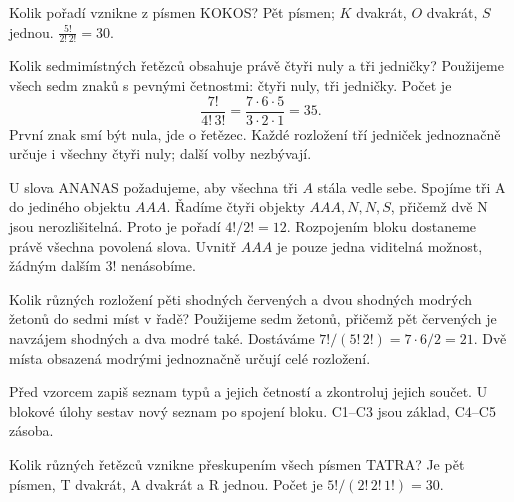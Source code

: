 \documentclass[11pt,a4paper]{article}
\begin{document}
\begin{prikladReseniBox}[title={Příklad P2}]
Kolik pořadí vznikne z písmen \textsc{KOKOS}?
\tcblower
Pět písmen; \(K\) dvakrát, \(O\) dvakrát, \(S\) jednou. \(\frac{5!}{2!\,2!}=30\).
\end{prikladReseniBox}


\begin{prikladReseniBox}[title={Příklad P3}]
Kolik sedmimístných řetězců obsahuje právě čtyři nuly a tři jedničky?
\tcblower
Použijeme všech sedm znaků s pevnými četnostmi: čtyři nuly, tři jedničky. Počet je
\[
 \frac{7!}{4!\,3!}=\frac{7\cdot6\cdot5}{3\cdot2\cdot1}=35.
\]
První znak smí být nula, jde o řetězec. Každé rozložení tří jedniček jednoznačně určuje i všechny čtyři nuly; další volby nezbývají.
\end{prikladReseniBox}


\begin{prikladReseniBox}[title={Příklad P4}]
U slova \textsc{ANANAS} požadujeme, aby všechna tři \(A\) stála vedle sebe.
\tcblower
Spojíme tři A do jediného objektu $AAA$. Řadíme čtyři objekty $AAA,N,N,S$, přičemž dvě N jsou nerozlišitelná. Proto je pořadí $4!/2!=12$. Rozpojením bloku dostaneme právě všechna povolená slova. Uvnitř $AAA$ je pouze jedna viditelná možnost, žádným dalším $3!$ nenásobíme.
\end{prikladReseniBox}


\begin{prikladReseniBox}[title={Příklad P5}]
Kolik různých rozložení pěti shodných červených a dvou shodných modrých žetonů do sedmi míst v řadě?
\tcblower
Použijeme sedm žetonů, přičemž pět červených je navzájem shodných a dva modré také. Dostáváme $7!/(5!\,2!)=7\cdot6/2=21$. Dvě místa obsazená modrými jednoznačně určují celé rozložení.
\end{prikladReseniBox}


\newpage
{}

Před vzorcem zapiš seznam typů a jejich četností a zkontroluj jejich součet. U blokové úlohy sestav nový seznam po spojení bloku. C1–C3 jsou základ, C4–C5 zásoba.

\begin{zadaniReseniBox}[title={Úloha C1}]
Kolik různých řetězců vznikne přeskupením všech písmen \textsc{TATRA}?
\tcblower
Je pět písmen, T dvakrát, A dvakrát a R jednou. Počet je $5!/(2!\,2!\,1!)=30$.
\end{zadaniReseniBox}
\end{document}

